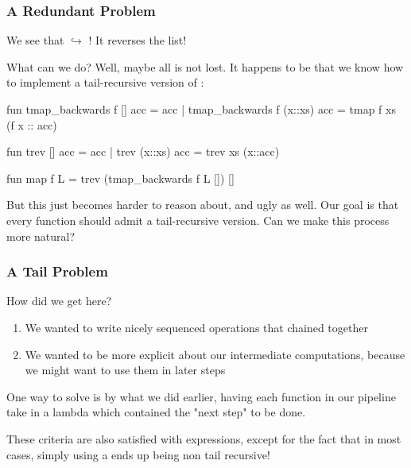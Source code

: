 \documentclass[aspectratio=169, handout]{beamer}
\begin{document}
\begin{frame}[fragile]
  \frametitle{A Redundant Problem}

  We see that  $\hookrightarrow$
  \code{["3", "2", "1"]}! It reverses the list!

  \pause
  \vspace{\fill}

  What can we do? Well, maybe all is not lost. It happens to be that
  we know how to implement a tail-recursive version of :

  {\small
  \begin{codeblock}
    fun tmap_backwards f [] acc = acc
      | tmap_backwards f (x::xs) acc = tmap f xs (f x :: acc)

    fun trev [] acc = acc
      | trev (x::xs) acc = trev xs (x::acc)

    fun map f L = trev (tmap_backwards f L []) []
  \end{codeblock}
  }

  \pause
  \vspace{\fill}

  But this just becomes harder to reason about, and ugly as well. Our goal
  is that every function should admit a tail-recursive version. Can we
  make this process more natural?
\end{frame}

\begin{frame}[fragile]
  \frametitle{A Tail Problem}

  How did we get here?

  \pause
  \vspace{\fill}

  \begin{enumerate}
    \item We wanted to write nicely sequenced operations that chained together
    \item We wanted to be more explicit about our intermediate computations, because
    we might want to use them in later steps
  \end{enumerate}

  \pause
  \vspace{\fill}

  One way to solve is by what we did earlier, having each function in our pipeline
  take in a lambda which contained the "next step" to be done.

  \pause
  \vspace{\fill}

  These criteria are also satisfied with  expressions, except for the
  fact that in most cases, simply using a  ends up being non
  tail recursive!

  \pause
  \vspace{\fill}

\end{frame}
\end{document}
